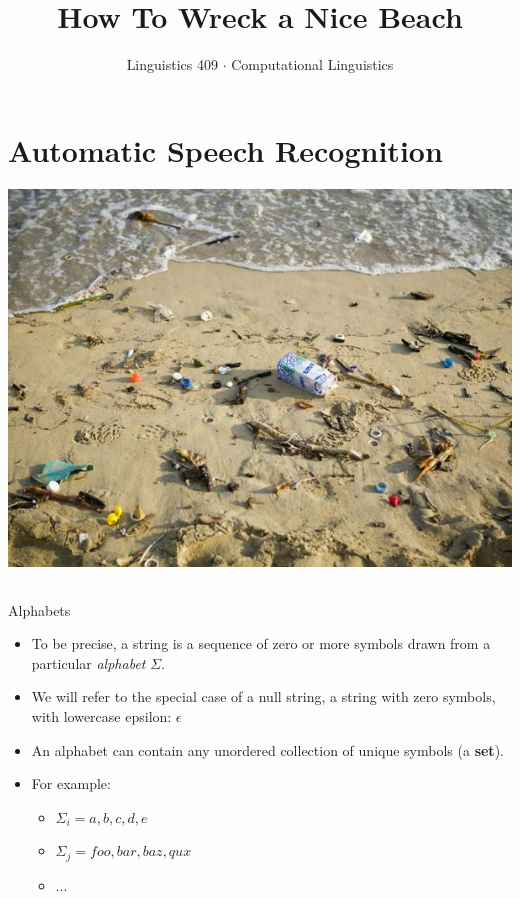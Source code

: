 \documentclass[9pt,xcolor=pdftex,dvipsnames,table]{beamer}
\title{How To Wreck a Nice Beach}
\author{Linguistics 409 $\cdot$ Computational Linguistics}
\date{}
\begin{document}

\section{Automatic Speech Recognition}

\begin{frame}

	\titlepage
	\vspace{-1.5cm}
	\begin{center}
    \includegraphics[scale=.4]{niceBeach.jpg}
	\end{center}
	
\end{frame}

\subsection{}
\begin{frame}{Alphabets}

	\begin{itemize}
		\item To be precise, a string is a sequence of zero or more symbols drawn from a particular \emph{alphabet} $\Sigma$.
		\item We will refer to the special case of a null string, a string with zero symbols, with lowercase epsilon: {\large $\epsilon$}
		\item An alphabet can contain any unordered collection of unique symbols (a \textbf{set}).
		\item For example:
			\begin{itemize}
				\item $\Sigma_i = {a, b, c, d, e}$
				\item $\Sigma_j = {foo, bar, baz, qux}$ 
				\item ...
			\end{itemize}
	\end{itemize}
\end{frame}
\end{document}
